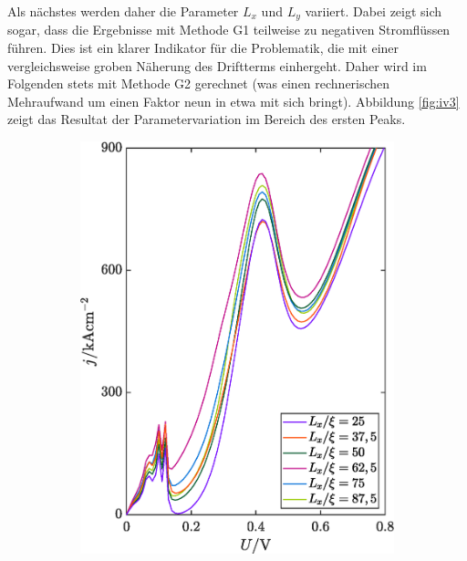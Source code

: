 Als nächstes werden daher die Parameter $L_x$ und $L_y$ variiert. Dabei zeigt sich sogar, dass die Ergebnisse mit Methode G1 teilweise zu negativen Stromflüssen führen. Dies ist ein klarer Indikator für die Problematik, die mit einer vergleichsweise groben Näherung des Driftterms einhergeht. Daher wird im Folgenden stets mit Methode G2 gerechnet (was einen rechnerischen Mehraufwand um einen Faktor neun in etwa mit sich bringt). Abbildung \ref{fig:iv3} zeigt das Resultat der Parametervariation im Bereich des ersten Peaks.
\begin{figure}
    \centering
    \begin{subfigure}[b]{0.48\textwidth}
        \centering
        \includegraphics[width=\textwidth]{plots/IV/IV_Lx_variation.eps}
        \label{fig:iv3_1}
    \end{subfigure}
    \hfill
    \begin{subfigure}[b]{0.48\textwidth}
        \centering

\end{subfigure}
\end{figure}
